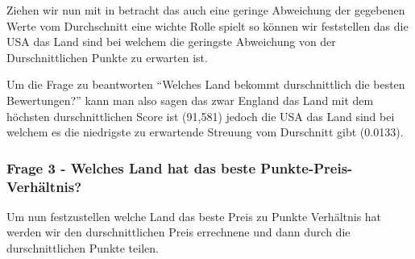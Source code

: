 \documentclass[
]{article}
\newenvironment{Shaded}{\begin{snugshade}}{\end{snugshade}}
\newcommand{\AttributeTok}[1]{\textcolor[rgb]{0.13,0.29,0.53}{#1}}
\newcommand{\CommentTok}[1]{\textcolor[rgb]{0.56,0.35,0.01}{\textit{#1}}}
\newcommand{\FloatTok}[1]{\textcolor[rgb]{0.00,0.00,0.81}{#1}}
\newcommand{\FunctionTok}[1]{\textcolor[rgb]{0.13,0.29,0.53}{\textbf{#1}}}
\newcommand{\NormalTok}[1]{#1}
\newcommand{\OtherTok}[1]{\textcolor[rgb]{0.56,0.35,0.01}{#1}}
\newcommand{\SpecialCharTok}[1]{\textcolor[rgb]{0.81,0.36,0.00}{\textbf{#1}}}
\begin{document}
Ziehen wir nun mit in betracht das auch eine geringe Abweichung der
gegebenen Werte vom Durchschnitt eine wichte Rolle spielt so können wir
feststellen das die USA das Land sind bei welchem die geringste
Abweichung von der Durschnittlichen Punkte zu erwarten ist.

Um die Frage zu beantworten ``Welches Land bekommt durschnittlich die
besten Bewertungen?'' kann man also sagen das zwar England das Land mit
dem höchsten durschnittlichen Score ist (91,581) jedoch die USA das Land
sind bei welchem es die niedrigste zu erwartende Streuung vom Durschnitt
gibt (0.0133).

\subsubsection{Frage 3 - Welches Land hat das beste
Punkte-Preis-Verhältnis?}\label{frage-3---welches-land-hat-das-beste-punkte-preis-verhuxe4ltnis}

Um nun festzustellen welche Land das beste Preis zu Punkte Verhältnis
hat werden wir den durschnittlichen Preis errechnene und dann durch die
durschnittlichen Punkte teilen.

\begin{Shaded}
\end{Shaded}
\end{document}
